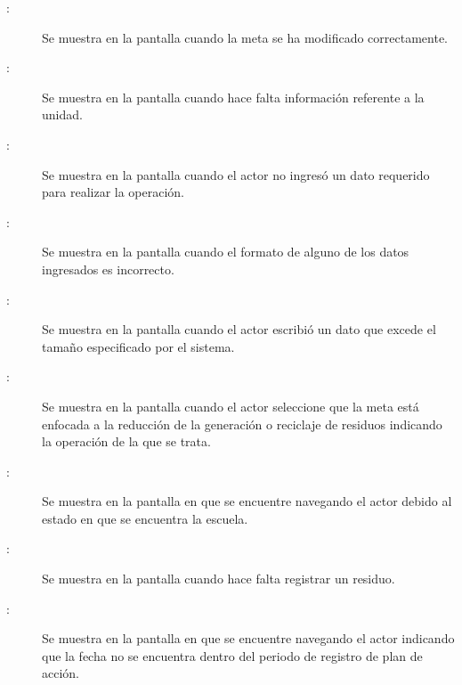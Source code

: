 \begin{description}
	\item[:] Se muestra en la pantalla  cuando la meta se ha modificado correctamente.
	\item[:] Se muestra en la pantalla  cuando hace falta información referente a la unidad.
	\item[:] Se muestra en la pantalla  cuando el actor no ingresó un dato requerido para realizar la operación.
	\item[:] Se muestra en la pantalla  cuando el formato de alguno de los datos ingresados es incorrecto.
	\item[:] Se muestra en la pantalla  cuando el actor escribió un dato que excede el tamaño especificado por el sistema.
	\item[:] Se muestra en la pantalla  cuando el actor seleccione que la meta está enfocada a la reducción de la generación o reciclaje de residuos indicando la operación de la que se trata.
	\item[:] Se muestra en la pantalla en que se encuentre navegando el actor debido al estado en que se encuentra la escuela.	
	\item[:] Se muestra en la pantalla  cuando hace falta registrar un residuo.
	\item[:] Se muestra en la pantalla en que se encuentre navegando el actor indicando que la fecha no se encuentra dentro del periodo de registro de plan de acción.
\end{description}

